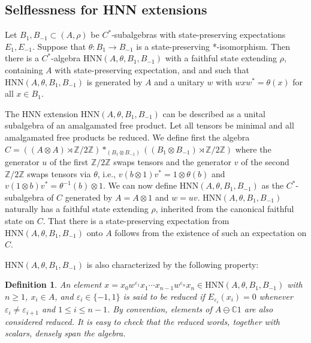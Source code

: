 \documentclass{amsart}
\newtheorem{definition}[theorem]{Definition}
\theoremstyle{definition}
\newcommand{\Z}{\mathbb{Z}}
\newcommand{\C}{\mathbb{C}}
\begin{document}
\subsection{Selflessness for HNN extensions}

Let $B_1,B_{-1}\subset (A,\rho)$ be $C^*$-subalgebras with state-preserving expectations $E_1,E_{-1}$. Suppose that $\theta:B_1\to B_{-1}$ is a state-preserving *-isomorphism. Then there is a $C^\ast$-algebra $\mathrm{HNN}(A,\theta,B_1,B_{-1})$ with a faithful state extending $\rho$, containing $A$ with state-preserving expectation, and and such that $\mathrm{HNN}(A,\theta,B_1,B_{-1})$ is generated by $A$ and a unitary $w$ with $wxw^\ast = \theta(x)$ for all $x\in B_1$.

The HNN extension $\mathrm{HNN}(A,\theta,B_1,B_{-1})$ can be described as a unital subalgebra of an amalgamated free product. Let all tensors be minimal and all amalgamated free products be reduced. We define first the algebra $C = ((A\otimes A)\rtimes \Z/2\Z) *_{(B_1\otimes B_{-1})}((B_1\otimes B_{-1})\rtimes \Z/2\Z)$ where the generator $u$ of the first $\Z/2\Z$ swaps tensors and the generator $v$ of the second $\Z/2\Z$ swaps tensors via $\theta$, i.e., $v(b\otimes 1)v^\ast = 1\otimes\theta(b)$ and $v(1\otimes b)v^\ast = \theta^{-1}(b) \otimes 1$. We can now define $\mathrm{HNN}(A,\theta,B_1,B_{-1})$ as the $C^\ast$-subalgebra of $C$ generated by $A = A \otimes 1$ and $w = uv$. $\mathrm{HNN}(A,\theta,B_1,B_{-1})$ naturally has a faithful state extending $\rho$, inherited from the canonical faithful state on $C$. That there is a state-preserving expectation from $\mathrm{HNN}(A,\theta,B_1,B_{-1})$ onto $A$ follows from the existence of such an expectation on $C$.

$\mathrm{HNN}(A,\theta,B_1,B_{-1})$ is also characterized by the following property:

\begin{definition}
    An element $x = x_0w^{\varepsilon_1}x_1\cdots x_{n-1}w^{\varepsilon_n}x_n \in \mathrm{HNN}(A,\theta,B_1,B_{-1})$ with $n \ge 1$, $x_i\in A$, and $\varepsilon_i\in\{-1,1\}$ is said to be \emph{reduced} if $E_{\varepsilon_i}(x_i) = 0$ whenever $\varepsilon_i\neq \varepsilon_{i+1}$ and $1 \le i \le n-1$. By convention, elements of $A\ominus \C1$ are also considered reduced. It is easy to check that the reduced words, together with scalars, densely span the algebra.
\end{definition}
\end{document}
